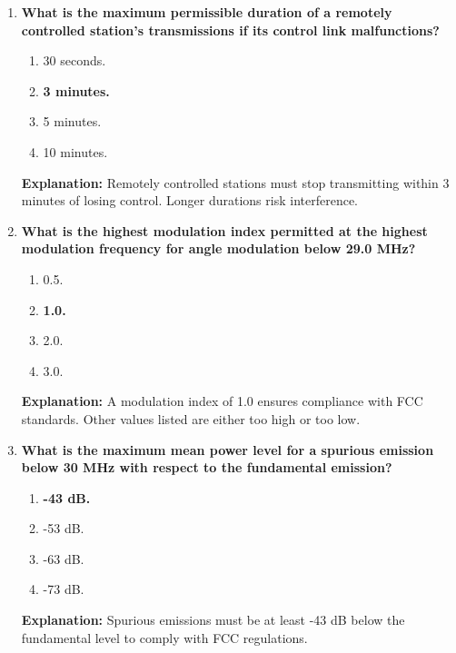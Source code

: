 \begin{enumerate}
    \item \textbf{What is the maximum permissible duration of a remotely controlled station’s transmissions if its control link malfunctions?}
    \begin{enumerate}
        \item 30 seconds.\\
        \item \textbf{3 minutes.}\\
        \item 5 minutes.\\
        \item 10 minutes.
    \end{enumerate}
    \textbf{Explanation:} Remotely controlled stations must stop transmitting within 3 minutes of losing control. Longer durations risk interference.

    \item \textbf{What is the highest modulation index permitted at the highest modulation frequency for angle modulation below 29.0 MHz?}
    \begin{enumerate}
        \item 0.5.\\
        \item \textbf{1.0.}\\
        \item 2.0.\\
        \item 3.0.
    \end{enumerate}
    \textbf{Explanation:} A modulation index of 1.0 ensures compliance with FCC standards. Other values listed are either too high or too low.

    \item \textbf{What is the maximum mean power level for a spurious emission below 30 MHz with respect to the fundamental emission?}
    \begin{enumerate}
        \item \textbf{-43 dB.}\\
        \item -53 dB.\\
        \item -63 dB.\\
        \item -73 dB.
    \end{enumerate}
    \textbf{Explanation:} Spurious emissions must be at least -43 dB below the fundamental level to comply with FCC regulations.


\end{enumerate}
